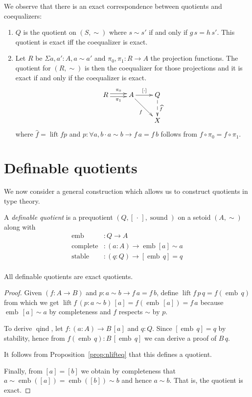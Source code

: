 \documentclass[envcountsame]{llncs}
\newcommand{\dotph}{\,\cdot\,} %
\providecommand{\class}[1]{[#1]}
\providecommand{\dlift}[1]{\widehat{#1}}
\DeclareMathOperator{\sound}{sound}
\DeclareMathOperator{\qind}{qind}
\DeclareMathOperator{\emb}{emb}
\DeclareMathOperator{\complete}{complete}
\DeclareMathOperator{\stable}{stable}
\DeclareMathOperator{\lift}{lift}
\renewcommand{\equiv}{=}
\begin{document}
We observe that there is an exact correspondence between quotients and coequalizers:
\begin{proposition}\hfill
\begin{enumerate}
\item $Q$ is the quotient on $(S,\sim)$ where $s\sim s'$ if and only if $g\,s=h\,s'$.
This quotient is exact if{f} the coequalizer is exact.
\item Let $R$ be $\Sigma a,a':A,a\sim a'$ and $\pi_0,\pi_1 : R\to A$ the projection functions. The quotient for $(R,\sim)$ is then the coequalizer for those projections and it is exact if and only if the coequalizer is exact.
\[\xymatrix{
R\ar@<0.5ex>[r]^{\pi_0}\ar@<-0.5ex>[r]_{\pi_1}& A\ar[r]^{\class\cdot}\ar[dr]_{f} & Q\ar@{-->}[d]^{\dlift f}\\
&&X
}\]
where $\dlift f=\lift f p$ and $p \colon \forall a,b\cdot a\sim b \to f\,a \equiv f\,b$ follows from $f \circ \pi_0 = f \circ \pi_1$.
\end{enumerate}
\end{proposition}

\section{Definable quotients}\label{sec:defquotients}

We now consider a general construction which allows us to construct quotients in type theory.

\begin{definition}\label{def:defquotients}
A \emph{definable quotient} is a prequotient $(Q, \class{\dotph}, \sound)$ on a setoid $(A,\sim)$ along with
\begin{align*}
\emb &: Q \to A\\
\complete &: (a : A) \to \emb {\class a} \sim a\\
\stable &: (q:Q) \to \class{\emb\,q} \equiv q\\
\end{align*}
\end{definition}

\begin{proposition}
All definable quotients are exact quotients.
\end{proposition}
\begin{proof}

Given $(f\colon A \to B)$ and $p : a\sim b \to f\,a \equiv f\,b$, define $\lift f\, p \,q = f (\emb\,q)$ from which we get $\lift f \,(p : a \sim b)\,\class a\equiv f(\emb\,\class a)\equiv f\,a$ because $\emb\,\class a\sim a$ by completeness and $f$ respects $\sim$ by $p$.

To derive $\qind$, let $f:(a\colon A)\to B\,\class a$ and $q:Q$. Since $ \class{\emb\,q} \equiv q$ by stability, hence from $f (\emb\,q):B\,\class{\emb\,q}$ we can derive a proof of $B\,q$.

It follows from Proposition~\ref{prop:nlifteq} that this defines a quotient.

Finally, from $\class a \equiv \class b$
we obtain by completeness that $a\sim\emb(\class a)\equiv\emb(\class b)\sim b$ and hence $a\sim b$. That is, the quotient is exact.
\end{proof}
\end{document}

